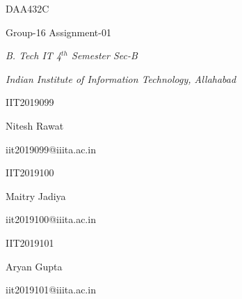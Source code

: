 \documentclass[12pt,a4paper]{article}
\begin{document}
\begin{center}DAA432C \end{center}
\begin{center}Group-16 Assignment-01\end{center}

\begin{center}\textit{B. Tech IT 4$^{th}$ Semester Sec-B}
\end{center}

\begin{center}\textit{Indian Institute of Information Technology, 
Allahabad}\end{center}


\begin{multicols}{3}
\begin{center}IIT2019099\end{center}

\begin{center}Nitesh Rawat\end{center}

\begin{center}iit2019099@iiita.ac.in\end{center}

\begin{center}IIT2019100\end{center}

\begin{center}Maitry Jadiya\end{center}

\begin{center}iit2019100@iiita.ac.in\end{center}

\begin{center}IIT2019101\end{center}

\begin{center}Aryan Gupta\end{center}

\begin{center}iit2019101@iiita.ac.in\end{center}
\end{multicols}
\end{document}
